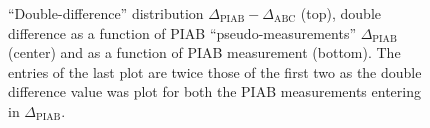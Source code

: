 \documentclass{cmspaper}
\begin{document}
\begin{figure}[hbtp]
  \begin{center}
    \caption{``Double-difference'' distribution
      $\Delta_{\mathrm{PIAB}}-\Delta_{\mathrm{ABC}}$ (top), double
      difference as a function of PIAB ``pseudo-measurements''
      $\Delta_{\mathrm{PIAB}}$ (center)
      and as a function of PIAB measurement (bottom). The entries of the
      last plot are twice those of the first two as the double
      difference value was plot for both the PIAB measurements
      entering in $\Delta_{\mathrm{PIAB}}$.
    }
    \label{fig:calib_delta}
  \end{center}
\end{figure}
\end{document}
